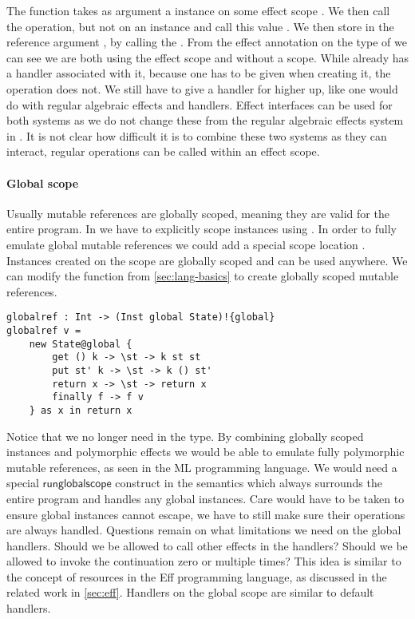 The function  takes as argument a  instance on some effect scope .
We then call the  operation, but not on an instance and call this value .
We then store  in the reference argument , by calling the .
From the effect annotation on the type of  we can see we are both using the effect scope  and  without a scope.
While  already has a handler associated with it, because one has to be given when creating it, the  operation does not.
We still have to give a handler for  higher up, like one would do with regular algebraic effects and handlers.
Effect interfaces can be used for both systems as we do not change these from the regular algebraic effects system in \lang{}.
It is not clear how difficult it is to combine these two systems as they can interact, regular operations can be called within an effect scope.

\paragraph{Global scope} \label{sec:globalscopes}
Usually mutable references are globally scoped, meaning they are valid for the entire program.
In \lang{} we have to explicitly scope instances using .
In order to fully emulate global mutable references we could add a special scope location .
Instances created on the  scope are globally scoped and can be used anywhere.
We can modify the  function from \cref{sec:lang-basics} to create globally scoped mutable references.
\begin{verbatim}
globalref : Int -> (Inst global State)!{global}
globalref v =
	new State@global {
		get () k -> \st -> k st st
		put st' k -> \st -> k () st'
		return x -> \st -> return x
		finally f -> f v
	} as x in return x
\end{verbatim}

Notice that we no longer need  in the type.
By combining globally scoped instances and polymorphic effects we would be able to emulate fully polymorphic mutable references, as seen in the ML programming language.
We would need a special $\mathsf{runglobalscope}$ construct in the semantics which always surrounds the entire program and handles any global instances.
Care would have to be taken to ensure global instances cannot escape, we have to still make sure their operations are always handled.
Questions remain on what limitations we need on the global handlers.
Should we be allowed to call other effects in the handlers?
Should we be allowed to invoke the continuation zero or multiple times?
This idea is similar to the concept of resources in the Eff programming language, as discussed in the related work in \cref{sec:eff}.
Handlers on the global scope are similar to default handlers.
